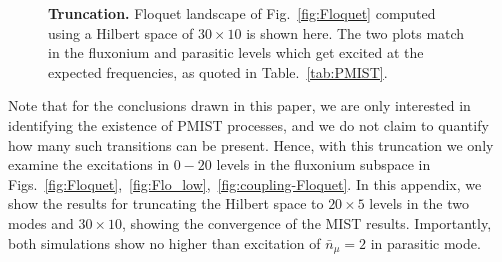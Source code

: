 \documentclass[%
reprint,
superscriptaddress,
 amsmath,amssymb,
 aps,
 prx,
longbibliography,
floatfix,
]{revtex4-2}
\begin{document}
{\begin{figure}[t]
        \caption{{\bf Truncation.} Floquet landscape of Fig.~\ref{fig:Floquet} computed using a Hilbert space of $30\times 10$ is shown here. The two plots match in the fluxonium and parasitic levels which get excited at the expected frequencies, as quoted in Table.~\ref{tab:PMIST}.%
        }
        \label{fig:truncation}
    \end{figure}
    Note that for the conclusions drawn in this paper, we are only interested in identifying the existence of PMIST processes, and we do not claim to quantify how many such transitions can be present. Hence, with this truncation we only examine the excitations in $0-20$ levels in the fluxonium subspace in Figs.~\ref{fig:Floquet},~\ref{fig:Flo_low},~\ref{fig:coupling-Floquet}. In this appendix, we show the results for truncating the Hilbert space to $20
    \times 5$ levels in the two modes and $30
    \times 10$, showing the convergence of the MIST results. Importantly, both simulations show no higher than excitation of $\bar n_\mu=2$ in parasitic mode.

}
\end{document}
